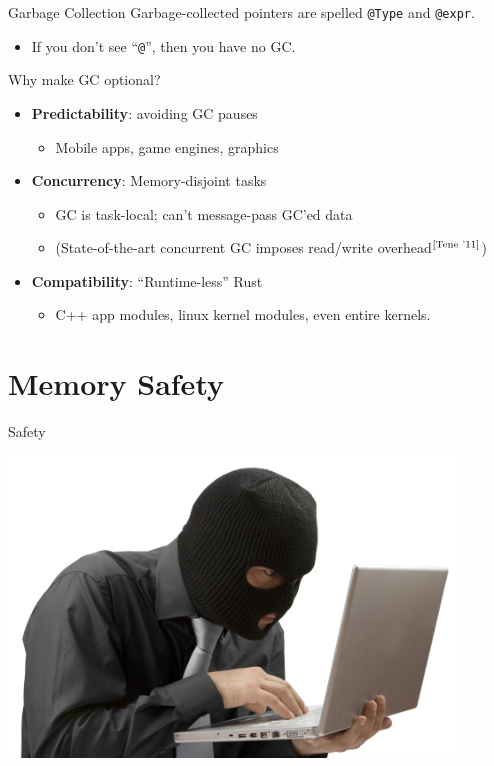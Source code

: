 \documentclass[xcolor=dvipsnames]{beamer}
\begin{document}
\begin{frame}{Garbage Collection}
	Garbage-collected pointers are spelled \texttt{@Type} and \texttt{@expr}.
	\begin{itemize}
		\item If you don't see ``\texttt{@}'', then you have no GC.
	\end{itemize}
	\pause
	\linegap

	Why make GC optional?
	\begin{itemize}
		\item \textbf{Predictability}: avoiding GC pauses
		\begin{itemize}
			\item Mobile apps, game engines, graphics
		\end{itemize}
		\item \textbf{Concurrency}: Memory-disjoint tasks
		\begin{itemize}
			\item GC is task-local; can't message-pass GC'ed data
			\item (State-of-the-art concurrent GC imposes read/write overhead$^{\small \text{[Tene '11]}}$)
		\end{itemize}
		\item \textbf{Compatibility}: ``Runtime-less'' Rust
		\begin{itemize}
			\item C++ app modules, linux kernel modules, even entire kernels.
		\end{itemize}
	\end{itemize}
\end{frame}

\section{Memory Safety}

\begin{frame}{Safety}
	\begin{center}
	\includegraphics[width=0.9\textwidth]{safety.jpg}
	\end{center}
\end{frame}
\end{document}
